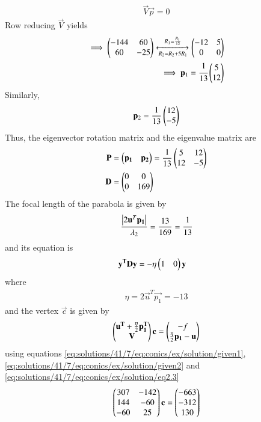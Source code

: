 \begin{enumerate}
\begin{align}
\vec{V}\vec{p} = 0
\end{align}
Row reducing $\vec{V}$ yields
\begin{align}
\implies
\begin{pmatrix}-144&60\\60&-25\end{pmatrix}\xleftrightarrow[R_2=R_2+5R_1]{R_1=\frac{R_1}{12}}\begin{pmatrix}-12&5\\0&0\end{pmatrix}\\
\implies\mathbf{p}_1=\cfrac{1}{13}\begin{pmatrix}5\\12\end{pmatrix} \label{eq:solutions/41/7/eq:conics/ex/solution/eq2.3}
\end{align}
Similarly, 
\begin{align}
\mathbf{p}_2=\frac{1}{13}\begin{pmatrix}12\\-5\end{pmatrix} 
\end{align}
%
Thus, the eigenvector rotation matrix and the eigenvalue matrix are
\begin{align}
\mathbf{P}&=\begin{pmatrix}\mathbf{p_1}&\mathbf{p_2}\end{pmatrix}=\frac{1}{13}\begin{pmatrix}5&12\\ 12 &-5\end{pmatrix} \\
\mathbf{D}&=\begin{pmatrix}0&0\\0&169\end{pmatrix}
\end{align}
The focal length of the parabola is given by 
\begin{align}
\frac{\left\vert2\mathbf{u}^T\mathbf{p_1}\right\vert}{\lambda_2}
    = \frac{13}{169}=\cfrac{1}{13}
\end{align}
and its equation is
\begin{align}
    \mathbf{y^T}\mathbf{D}\mathbf{y}&=-\eta\begin{pmatrix}1&0\end{pmatrix}\mathbf{y}\label{eq:solutions/41/7/eq:conics/ex/solution/eq2.4}
\end{align}
where
\begin{align}
    \eta=2\vec{u}^T\vec{p_1}=-13
\end{align}
and the vertex $\vec{c}$ is given by 
\begin{align}
    \begin{pmatrix}\mathbf{u^T}+\frac{\eta}{2}\mathbf{p_1^T} \\ \mathbf{V}\end{pmatrix}\mathbf{c}=
    \begin{pmatrix}-f \\\frac{\eta}{2}\mathbf{p_1}-\mathbf{u}\end{pmatrix} 
\end{align}
using equations \eqref{eq:solutions/41/7/eq:conics/ex/solution/given1},\eqref{eq:solutions/41/7/eq:conics/ex/solution/given2} and \eqref{eq:solutions/41/7/eq:conics/ex/solution/eq2.3}
\begin{align}
    \myvec{307& -142 \\ 144 & -60 \\  -60 & 25 }\vec{c}=\myvec{-663 \\ -312\\ 130} \label{eq:solutions/41/7/eq:conics/ex/solution/eqcen}

\end{align}
\end{enumerate}
